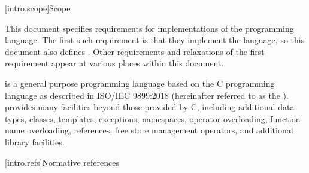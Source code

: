 
[intro.scope]{Scope}

\pnum
{}%
This document specifies requirements for implementations
of the \Cpp{} programming language. The first such requirement is that
they implement the language, so this document also
defines \Cpp{}. Other requirements and relaxations of the first
requirement appear at various places within this document.

\pnum
\Cpp{} is a general purpose programming language based on the C
programming language as described in ISO/IEC 9899:2018
 (hereinafter referred to as the
). \Cpp{} provides many facilities
beyond those provided by C, including additional data types,
classes, templates, exceptions, namespaces, operator
overloading, function name overloading, references, free store
management operators, and additional library facilities.%

%
[intro.refs]{Normative references}

